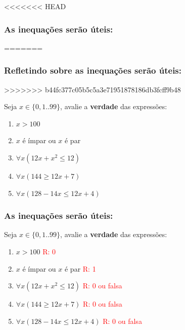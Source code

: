 \documentclass{beamer}
\begin{document}
\begin{frame}
<<<<<<< HEAD
\frametitle{As inequações serão úteis:}
=======
\frametitle{Refletindo sobre as inequações serão úteis:}
>>>>>>> b44fc377c05b5c5a3e71951878186db3fcff9b48

\begin{exampleblock}
{Seja $x \in \{0,1..99\}$, avalie a \textbf{verdade} das expressões:}
\begin{enumerate}
  
  \item $ x > 100$
  
  \item $x$ é ímpar ou $x$ é par
  
  \item $\forall x(12x + x^2 \le 12)$

  \item $\forall x(144 \ge 12x + 7)$

  \item $\forall x(128 - 14x \le 12x + 4)$
      
      
\end{enumerate}
\end{exampleblock}
\end{frame}


\begin{frame}
\frametitle{As inequações serão úteis:}

\begin{exampleblock}
{Seja $x \in \{0,1..99\}$, avalie a \textbf{verdade} das expressões:}
\begin{enumerate}
  
  \item $ x > 100$ \hspace{1cm} \textcolor{red}{R: 0}
  
  \item $x$ é ímpar ou $x$ é par \hspace{1cm} \textcolor{red}{R: 1}

  
  \item $\forall x(12x + x^2 \le 12)$
\hspace{1cm} \textcolor{red}{R: 0 ou falsa}



  \item $\forall x(144 \ge 12x + 7)$ 
\hspace{1cm} \textcolor{red}{R: 0 ou falsa}

  \item $\forall x(128 - 14x \le 12x + 4)$ 
\hspace{1cm} \textcolor{red}{R: 0 ou falsa}
      
\end{enumerate}
\end{exampleblock}
\end{frame}
\end{document}
